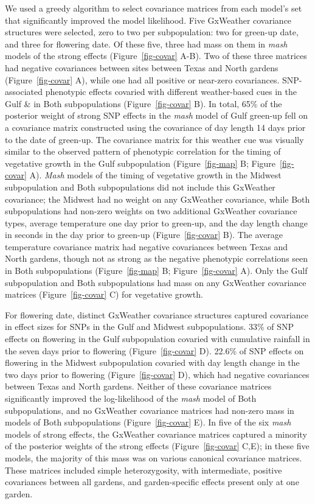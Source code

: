 \documentclass[
  9pt,
  twocolumn,
  twoside]{pnas-new}
\begin{document}
We used a greedy algorithm to select covariance matrices from each
model's set that significantly improved the model likelihood. Five
GxWeather covariance structures were selected, zero to two per
subpopulation: two for green-up date, and three for flowering date. Of
these five, three had mass on them in \emph{mash} models of the strong
effects (Figure~\ref{fig-covar} A-B). Two of these three matrices had
negative covariances between sites between Texas and North gardens
(Figure~\ref{fig-covar} A), while one had all positive or near-zero
covariances. SNP-associated phenotypic effects covaried with different
weather-based cues in the Gulf \& in Both subpopulations
(Figure~\ref{fig-covar} B). In total, 65\% of the posterior weight of
strong SNP effects in the \emph{mash} model of Gulf green-up fell on a
covariance matrix constructed using the covariance of day length 14 days
prior to the date of green-up. The covariance matrix for this weather
cue was visually similar to the observed pattern of phenotypic
correlation for the timing of vegetative growth in the Gulf
subpopulation (Figure~\ref{fig-map} B; Figure~\ref{fig-covar} A).
\emph{Mash} models of the timing of vegetative growth in the Midwest
subpopulation and Both subpopulations did not include this GxWeather
covariance; the Midwest had no weight on any GxWeather covariance, while
Both subpopulations had non-zero weights on two additional GxWeather
covariance types, average temperature one day prior to green-up, and the
day length change in seconds in the day prior to green-up
(Figure~\ref{fig-covar} B). The average temperature covariance matrix
had negative covariances between Texas and North gardens, though not as
strong as the negative phenotypic correlations seen in Both
subpopulations (Figure~\ref{fig-map} B; Figure~\ref{fig-covar} A). Only
the Gulf subpopulation and Both subpopulations had mass on any GxWeather
covariance matrices (Figure~\ref{fig-covar} C) for vegetative growth.

For flowering date, distinct GxWeather covariance structures captured
covariance in effect sizes for SNPs in the Gulf and Midwest
subpopulations. 33\% of SNP effects on flowering in the Gulf
subpopulation covaried with cumulative rainfall in the seven days prior
to flowering (Figure~\ref{fig-covar} D). 22.6\% of SNP effects on
flowering in the Midwest subpopulation covaried with day length change
in the two days prior to flowering (Figure~\ref{fig-covar} D), which had
negative covariances between Texas and North gardens. Neither of these
covariance matrices significantly improved the log-likelihood of the
\emph{mash} model of Both subpopulations, and no GxWeather covariance
matrices had non-zero mass in models of Both subpopulations
(Figure~\ref{fig-covar} E). In five of the six \emph{mash} models of
strong effects, the GxWeather covariance matrices captured a minority of
the posterior weights of the strong effects (Figure~\ref{fig-covar}
C,E); in these five models, the majority of this mass was on various
canonical covariance matrices. These matrices included simple
heterozygosity, with intermediate, positive covariances between all
gardens, and garden-specific effects present only at one garden.
\end{document}
